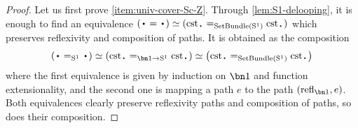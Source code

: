 \begin{proof}
  Let us first prove \ref{item:univ-cover-Sc-Z}. Through
  \cref{lem:S1-delooping}, it is enough to find an equivalence
  $(\base = \base) \weq (\cst\base =_{\SetBundle(\Sc)} \cst\base)$
  which preserves reflexivity and composition of paths. It is obtained
  as the composition
  \begin{displaymath}
    \left(\base =_{\Sc} \base\right) \weq \left( \cst\base=_{\bn 1\to \Sc}\cst\base \right)
    \weq \left( \cst\base =_{\SetBundle(\Sc)} \cst\base \right)
  \end{displaymath}
  where the first equivalence is given by induction on $\bn 1$ and
  function extensionality, and the second one is mapping a path $e$ to
  the path $(\refl{\bn 1}, e)$. Both equivalences clearly preserve
  reflexivity paths and composition of paths, so does their
  composition.
  



\end{proof}
